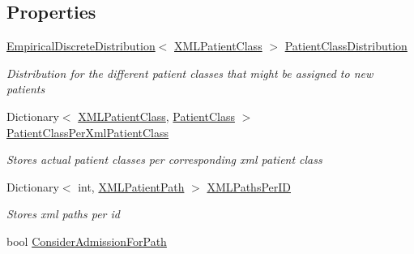 \subsection*{Properties}
\begin{DoxyCompactItemize}
\item 
\hyperlink{class_simulation_core_1_1_math_tool_1_1_distributions_1_1_empirical_discrete_distribution}{Empirical\+Discrete\+Distribution}$<$ \hyperlink{class_general_health_care_elements_1_1_input_1_1_x_m_l_input_classes_1_1_x_m_l_patient_class}{X\+M\+L\+Patient\+Class} $>$ \hyperlink{class_general_health_care_elements_1_1_input_1_1_generic_x_m_l_department_input_ada1853b40561d966bab501249a3ea4b5}{Patient\+Class\+Distribution}
\begin{DoxyCompactList}\small\item\em Distribution for the different patient classes that might be assigned to new patients \end{DoxyCompactList}\item 
Dictionary$<$ \hyperlink{class_general_health_care_elements_1_1_input_1_1_x_m_l_input_classes_1_1_x_m_l_patient_class}{X\+M\+L\+Patient\+Class}, \hyperlink{class_general_health_care_elements_1_1_patient_class}{Patient\+Class} $>$ \hyperlink{class_general_health_care_elements_1_1_input_1_1_generic_x_m_l_department_input_af111104d55be634fabc4d61a344fa0a6}{Patient\+Class\+Per\+Xml\+Patient\+Class}
\begin{DoxyCompactList}\small\item\em Stores actual patient classes per corresponding xml patient class \end{DoxyCompactList}\item 
Dictionary$<$ int, \hyperlink{class_general_health_care_elements_1_1_input_1_1_x_m_l_input_classes_1_1_x_m_l_patient_path}{X\+M\+L\+Patient\+Path} $>$ \hyperlink{class_general_health_care_elements_1_1_input_1_1_generic_x_m_l_department_input_ab0c59c69dbed5eceb3fcf187cd92549a}{X\+M\+L\+Paths\+Per\+ID}
\begin{DoxyCompactList}\small\item\em Stores xml paths per id \end{DoxyCompactList}\item 
bool \hyperlink{class_general_health_care_elements_1_1_input_1_1_generic_x_m_l_department_input_af169c03a2cfe61a7f9ebedcf839cd2bf}{Consider\+Admission\+For\+Path}

\end{DoxyCompactItemize}
